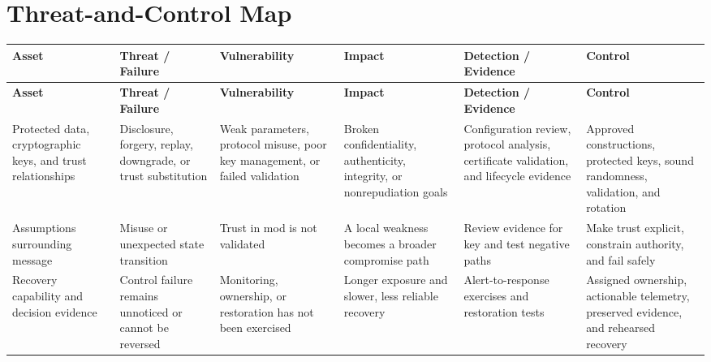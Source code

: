 \documentclass[11pt,letterpaper]{article}
\begin{document}
\section*{Threat-and-Control Map}
\begingroup\scriptsize\setlength{\tabcolsep}{2pt}
\begin{longtable}{>{\raggedright\arraybackslash}p{}>{\raggedright\arraybackslash}p{}>{\raggedright\arraybackslash}p{}>{\raggedright\arraybackslash}p{}>{\raggedright\arraybackslash}p{}>{\raggedright\arraybackslash}p{}}
\toprule\rowcolor{Navy}\color{white}\textbf{Asset} & \color{white}\textbf{Threat / Failure} & \color{white}\textbf{Vulnerability} & \color{white}\textbf{Impact} & \color{white}\textbf{Detection / Evidence} & \color{white}\textbf{Control}\\\midrule
\endfirsthead
\toprule\rowcolor{Navy}\color{white}\textbf{Asset} & \color{white}\textbf{Threat / Failure} & \color{white}\textbf{Vulnerability} & \color{white}\textbf{Impact} & \color{white}\textbf{Detection / Evidence} & \color{white}\textbf{Control}\\\midrule
\endhead
Protected data, cryptographic keys, and trust relationships & Disclosure, forgery, replay, downgrade, or trust substitution & Weak parameters, protocol misuse, poor key management, or failed validation & Broken confidentiality, authenticity, integrity, or nonrepudiation goals & Configuration review, protocol analysis, certificate validation, and lifecycle evidence & Approved constructions, protected keys, sound randomness, validation, and rotation\\\midrule
Assumptions surrounding message & Misuse or unexpected state transition & Trust in mod is not validated & A local weakness becomes a broader compromise path & Review evidence for key and test negative paths & Make trust explicit, constrain authority, and fail safely\\\midrule
Recovery capability and decision evidence & Control failure remains unnoticed or cannot be reversed & Monitoring, ownership, or restoration has not been exercised & Longer exposure and slower, less reliable recovery & Alert-to-response exercises and restoration tests & Assigned ownership, actionable telemetry, preserved evidence, and rehearsed recovery\\\midrule
\bottomrule
\end{longtable}
\endgroup
\end{document}
